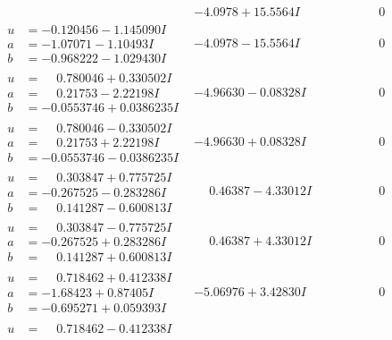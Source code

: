 \documentclass[1p]{elsarticle_modified}
\theoremstyle{definition}
\begin{document}
$$\begin{array}{c|c|c}
 & -4.0978 + 15.5564 I & \phantom{-0.000000 } 0 \\ \hline\begin{aligned}
u &= -0.120456 - 1.145090 I \\
a &= -1.07071 - 1.10493 I \\
b &= -0.968222 - 1.029430 I\end{aligned}
 & -4.0978 - 15.5564 I & \phantom{-0.000000 } 0 \\ \hline\begin{aligned}
u &= \phantom{-}0.780046 + 0.330502 I \\
a &= \phantom{-}0.21753 - 2.22198 I \\
b &= -0.0553746 + 0.0386235 I\end{aligned}
 & -4.96630 - 0.08328 I & \phantom{-0.000000 } 0 \\ \hline\begin{aligned}
u &= \phantom{-}0.780046 - 0.330502 I \\
a &= \phantom{-}0.21753 + 2.22198 I \\
b &= -0.0553746 - 0.0386235 I\end{aligned}
 & -4.96630 + 0.08328 I & \phantom{-0.000000 } 0 \\ \hline\begin{aligned}
u &= \phantom{-}0.303847 + 0.775725 I \\
a &= -0.267525 - 0.283286 I \\
b &= \phantom{-}0.141287 - 0.600813 I\end{aligned}
 & \phantom{-}0.46387 - 4.33012 I & \phantom{-0.000000 } 0 \\ \hline\begin{aligned}
u &= \phantom{-}0.303847 - 0.775725 I \\
a &= -0.267525 + 0.283286 I \\
b &= \phantom{-}0.141287 + 0.600813 I\end{aligned}
 & \phantom{-}0.46387 + 4.33012 I & \phantom{-0.000000 } 0 \\ \hline\begin{aligned}
u &= \phantom{-}0.718462 + 0.412338 I \\
a &= -1.68423 + 0.87405 I \\
b &= -0.695271 + 0.059393 I\end{aligned}
 & -5.06976 + 3.42830 I & \phantom{-0.000000 } 0 \\ \hline\begin{aligned}
u &= \phantom{-}0.718462 - 0.412338 I \\

\end{aligned}
\end{array}$$
\end{document}

